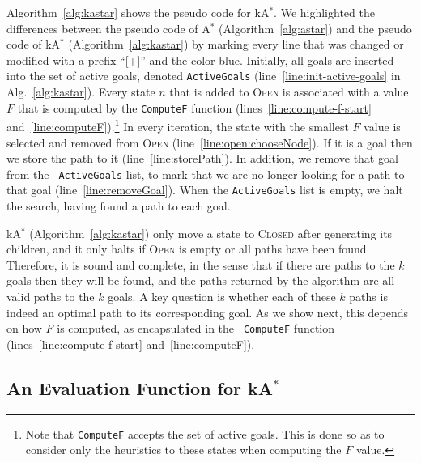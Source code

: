 \documentclass{aicom2e}
\newcommand{\astar}{A$^*$}
\newcommand{\kastar}{kA$^*$}
\newcommand{\open}{\textsc{Open}}
\newcommand{\closed}{\textsc{Closed}}
\newcommand{\roni}[1]{\textbf{[RS:#1]}}
\begin{document}
Algorithm~\ref{alg:kastar} shows the pseudo code for \kastar{}.
We highlighted the differences between the pseudo code of \astar{} (Algorithm~\ref{alg:astar})
and the pseudo code of \kastar{} (Algorithm~\ref{alg:kastar}) 
by marking every line that was changed or modified with a prefix ``[+]'' and the color blue. 
Initially, all goals are inserted into the set of active goals, denoted  {\tt ActiveGoals}
(line~\ref{line:init-active-goals} in Alg.~\ref{alg:kastar}). Every state
$n$ that is added to \open{} is associated with a value $F$ that is
computed by the {\tt ComputeF} function (lines~\ref{line:compute-f-start} and~\ref{line:computeF}).\footnote{Note that {\tt ComputeF} accepts the set of active goals. This is done so as to consider only the heuristics to these states when computing the $F$ value.} In every iteration, the state with
the smallest $F$ value is selected and removed from \open{}
(line~\ref{line:open:chooseNode}). If it is a goal then we store the path to it
(line~\ref{line:storePath}). In addition, we remove that goal from the {\tt
ActiveGoals} list, to mark that we are no longer looking for a path to that
goal (line~\ref{line:removeGoal}). When the {\tt ActiveGoals} list is empty, we
halt the search, having found a path to each goal.


\kastar{} (Algorithm~\ref{alg:kastar}) only move a state to \closed{} after
generating its children, and it only halts if \open{} is empty or all paths have been found. Therefore, it is sound and complete, in the sense that if there are paths to the $k$ goals then they will be found, and the paths returned by the algorithm are all valid paths to the $k$ goals. A key question is whether each of these $k$ paths is indeed
an optimal path to its corresponding goal.
As we show next, this depends on how $F$ is computed, as encapsulated in the {\tt
ComputeF} function (lines~\ref{line:compute-f-start} and~\ref{line:computeF}).


\subsection{An Evaluation Function for \kastar{}}
\end{document}
